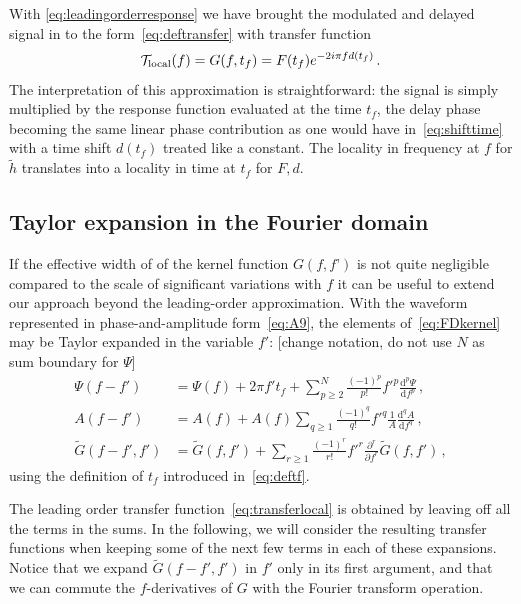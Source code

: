 \documentclass[aps,showpacs,twocolumn,
prd,superscriptaddress,nofootinbib]{revtex4-1}
\newcommand{\be}{\begin{equation}}
\newcommand{\ee}{\end{equation}}
\newcommand\ud{{\mathrm{d}}}
\newcommand\calT{{\mathcal{T}}}
\newcommand{\tf}{t_{f}}
\newcommand{\SM}[1]{{\color{Red} #1}}
\newcommand{\jgb}[1]{{\color{DarkGreen} #1}}
\begin{document}
\jgb{With \eqref{eq:leadingorderresponse} we have brought the modulated and delayed signal in to the form~\eqref{eq:deftransfer} with transfer function}
\be\label{eq:transferlocal}
	\calT_{\rm local}(f) = G(f, \tf) = F(t_{f}) e^{-2i\pi f d(t_{f})}\,.
\ee
The interpretation of this approximation is straightforward: the signal is simply multiplied by the response function evaluated at the time $\tf$, the delay phase becoming the same linear phase contribution as one would have in~\eqref{eq:shifttime} with a time shift $d(t_{f})$ treated like a constant. The locality in frequency at $f$ for $\tilde{h}$ translates into a locality in time at $t_{f}$ for $F,d$.


\subsection{Taylor expansion in the Fourier domain}
\label{subsec:TaylorFD}

\jgb{If the effective width of of the kernel function $G(f,f’)$ is not quite negligible compared to the scale of significant variations with $f$ it can be useful to extend our approach beyond the leading-order approximation. With the waveform represented in phase-and-amplitude form~\eqref{eq:A9}, the elements of~\eqref{eq:FDkernel} may be Taylor expanded in the variable $f'$: \SM{[change notation, do not use $N$ as sum boundary for $\Psi$]}
\begin{subequations}\label{eq:expandfprime}
\begin{align}
	\Psi(f-f') &= \Psi(f) + 2\pi f' \tf + \sum\limits_{p\geq 2}^{N} \frac{(-1)^{p}}{p!} {f'}^{p} \frac{\ud^{p} \Psi}{\ud f^{p}} \,, \label{eq:expandPsi}\\
	A(f-f') &= A(f)+A(f) \sum\limits_{q\geq 1} \frac{(-1)^{q}}{q!} {f'}^{q} \frac{1}{A}\frac{\ud^{q} A}{\ud f^{q}} \,, \label{eq:expandA}\\
	\tilde{G}(f-f', f') &=\tilde G(f,f')+ \sum\limits_{r\geq 1} \frac{(-1)^{r}}{r!} {f'}^{r} \frac{\partial^{r} }{\partial f^{r}}  \tilde{G}(f,f') \label{eq:expandG} \,,
\end{align}
\end{subequations}
using the definition of $t_{f}$ introduced in~\eqref{eq:deftf}.}

\jgb{The leading order transfer function~\eqref{eq:transferlocal} is obtained by leaving off all the terms in the sums.  In the following, we will consider the resulting transfer functions when keeping some of the next few terms in each of these expansions.} 
Notice that we expand $\tilde{G}(f-f',f')$ in $f'$ only in its first argument, and that we can commute the $f$-derivatives of $G$ with the Fourier transform operation.
\end{document}
